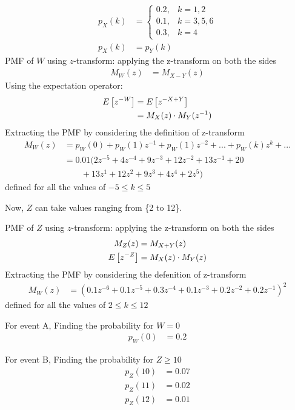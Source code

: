 \documentclass[]{article}
\begin{document}
\begin{align}
p_X(k) &= 
	\begin{cases}
		0.2, & k = 1,2 \\
		0.1, & k = 3,5,6 \\
		0.3, & k = 4
	\end{cases}\\
	p_X(k) &= p_Y(k) 
\end{align}
PMF of $W$ using $z$-transform:
applying the z-transform on both the sides
\begin{align}
	M_W(z) &= M_{X-Y}(z)
\end{align}
Using the expectation operator:
\begin{align}
	E{}\left[z^{-W}\right] &= E{}\left[z^{-X+Y}\right]\\
	&= M_X(z)\cdot M_Y(z^{-1})
\end{align}
Extracting the PMF by considering the definition of z-transform
\begin{align}
	M_W(z) &= p_W(0) +p_W(1)z^{-1} +p_W(1)z^{-2} + ... + p_W(k)z^k + ...\\
	&= 0.01(2z^{-5}+4z^{-4}+9z^{-3}+12z^{-2}+13z^{-1}+20\nonumber\\&\qquad+13z^{1}+12z^{2}+9z^{3}+4z^{4}+2z^{5})
\end{align}
defined for all the values of $-5 \leq k\leq 5$

Now,
$Z$ can take values ranging from \{2 to 12\}.

PMF of $Z$ using $z$-transform:
applying the z-transform on both the sides
\begin{align}
	M_Z(z) &= M_{X+Y}(z) \\
	E{}\left[z^{-Z}\right] &= M_X(z)\cdot M_Y(z)
\end{align}
Extracting the PMF by considering the defenition of z-transform
\begin{align}
	M_W(z) &= (0.1z^{-6}+0.1z^{-5}+0.3z^{-4}+0.1z^{-3}+0.2z^{-2}+0.2z^{-1})^2
\end{align}
defined for all the values of $2 \leq k\leq 12$

For event A,
Finding the probability for $W = 0$
\begin{align}
	p_W(0) &= 0.2 
\end{align}

For event B,
Finding the probability for $Z\geq 10$
\begin{align}
p_Z(10) &= 0.07\\
p_Z(11) &= 0.02\\
p_Z(12) &= 0.01
\end{align}
\end{document}
